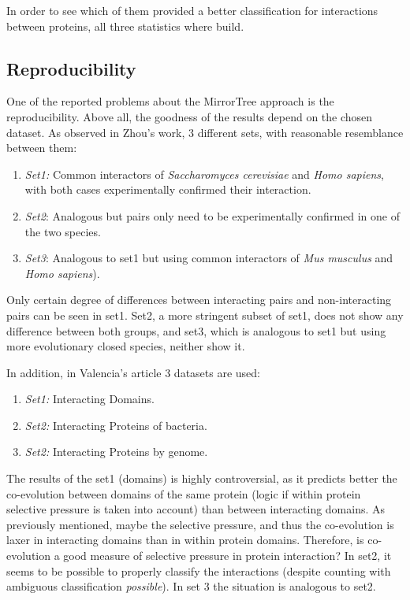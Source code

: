 \documentclass[11pt]{article}
\begin{document}
In order to see which of them provided a better classification for interactions between proteins, all three statistics where build.

\subsection{Reproducibility}
One of the reported problems about the MirrorTree approach is the reproducibility. Above all, the goodness of the results depend on the chosen dataset. As observed in Zhou's work\cite{Zhou13}, 3 different sets, with reasonable resemblance between them:
\begin{enumerate}
\setlength{\itemsep}{1pt}
	\item \textit{Set1:} Common interactors of \textit{Saccharomyces cerevisiae} and \textit{Homo sapiens}, 		with both cases experimentally confirmed their interaction.
	\item \textit{Set2}: Analogous but pairs only need to be experimentally confirmed in one of the two 			species.
	\item \textit{Set3}: Analogous to set1 but using common interactors of \textit{Mus musculus} and   \textit{Homo sapiens}).
\end{enumerate}
Only certain degree of differences between interacting pairs and non-interacting pairs can be seen in set1. Set2, a more stringent subset of set1, does not show any difference between both groups, and set3, which is analogous to set1 but using more evolutionary closed species, neither show it.

In addition, in Valencia's article\cite{Pazos2001} 3 datasets are used:
\begin{enumerate}
\setlength{\itemsep}{1pt}
	\item \textit{Set1:} Interacting Domains.
	\item \textit{Set2:} Interacting Proteins of bacteria.
	\item \textit{Set2:} Interacting Proteins by genome.
\end{enumerate}
The results of the set1 (domains) is highly controversial, as it predicts better the co-evolution between domains of the same protein (logic if within protein selective pressure is taken into account) than between interacting domains. As previously mentioned, maybe the selective pressure, and thus the co-evolution is laxer in interacting domains than in within protein domains. Therefore, is co-evolution a good measure of selective pressure in protein interaction?
In set2, it seems to be possible to properly classify the interactions (despite counting with ambiguous classification \textit{possible}). In set 3 the situation is analogous to set2.
\end{document}
